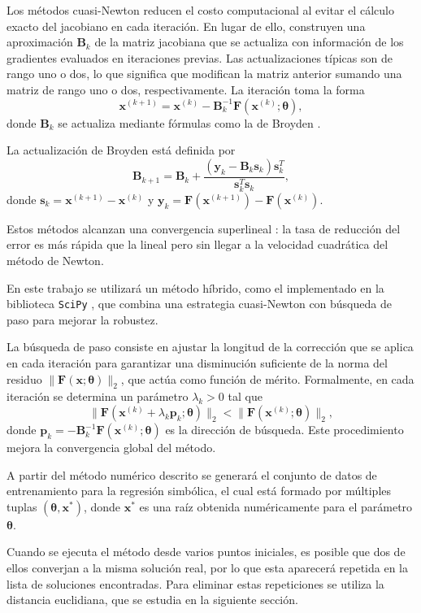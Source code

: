 \documentclass{article}
\newcommand{\xvec}{\mathbf{x}}
\newcommand{\thetavec}{\boldsymbol{\theta}}
\newcommand{\Fvec}{\mathbf{F}}
\begin{document}
Los métodos cuasi-Newton \cite{nocedal2006numerical} reducen el costo
computacional al evitar el cálculo exacto del jacobiano en cada
iteración. En lugar de ello, construyen una aproximación \(\mathbf{B}_k\)
de la matriz jacobiana que se actualiza con información de los gradientes
evaluados en iteraciones previas. Las actualizaciones típicas son de
rango uno o dos, lo que significa que modifican la matriz anterior
sumando una matriz de rango uno o dos, respectivamente. La iteración toma
la forma
\[
\xvec^{(k+1)} = \xvec^{(k)} - \mathbf{B}_k^{-1}
\Fvec(\xvec^{(k)}; \thetavec),
\]
donde \(\mathbf{B}_k\) se actualiza mediante fórmulas como la de Broyden
\cite{broyden1965class}.

La actualización de Broyden está definida por
\[
\mathbf{B}_{k+1} = \mathbf{B}_k +
\frac{(\mathbf{y}_k - \mathbf{B}_k \mathbf{s}_k) \mathbf{s}_k^T}
{\mathbf{s}_k^T \mathbf{s}_k},
\]
donde \(\mathbf{s}_k = \xvec^{(k+1)} - \xvec^{(k)}\) y
\(\mathbf{y}_k = \Fvec(\xvec^{(k+1)}) - \Fvec(\xvec^{(k)})\).

Estos métodos alcanzan una convergencia superlineal
\cite{nocedal2006numerical}: la tasa de reducción del error es más rápida
que la lineal pero sin llegar a la velocidad cuadrática del método de
Newton.

En este trabajo se utilizará un método híbrido, como el implementado en
la biblioteca \texttt{SciPy} \cite{virtanen2020scipy}, que combina una
estrategia cuasi-Newton con búsqueda de paso para mejorar la robustez.

La búsqueda de paso consiste en ajustar la longitud de la corrección que
se aplica en cada iteración para garantizar una disminución suficiente de
la norma del residuo \(\|\Fvec(\xvec; \thetavec)\|_2\), que actúa como
función de mérito. Formalmente, en cada iteración se determina un
parámetro \(\lambda_k > 0\) tal que
\[
\|\Fvec(\xvec^{(k)} + \lambda_k \mathbf{p}_k; \thetavec)\|_2 <
\|\Fvec(\xvec^{(k)}; \thetavec)\|_2,
\]
donde \(\mathbf{p}_k = -\mathbf{B}_k^{-1}\Fvec(\xvec^{(k)}; \thetavec)\)
es la dirección de búsqueda. Este procedimiento mejora la convergencia
global del método.

A partir del método numérico descrito se generará el conjunto de datos
de entrenamiento para la regresión simbólica, el cual está formado por
múltiples tuplas \((\thetavec, \xvec^*)\), donde \(\xvec^*\) es una raíz
obtenida numéricamente para el parámetro \(\thetavec\).

Cuando se ejecuta el método desde varios puntos iniciales, es posible
que dos de ellos converjan a la misma solución real, por lo que esta
aparecerá repetida en la lista de soluciones encontradas. Para eliminar
estas repeticiones se utiliza la distancia euclidiana, que se estudia en
la siguiente sección.
\end{document}
